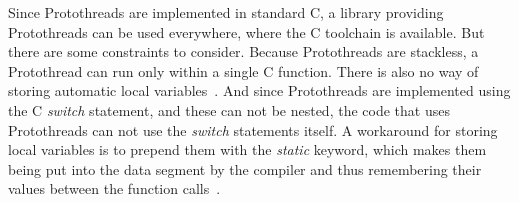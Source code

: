 Since Protothreads are implemented in standard C, a library providing Protothreads can be used everywhere,
where the C toolchain is available.
But there are some constraints to consider.
Because Protothreads are stackless, a Protothread can run only within a single C function. %
There is also no way of storing automatic local variables~\cite{contiki-docs}. %
And since Protothreads are implemented using the C {\it switch} statement, and these can %
not be nested, the code that uses Protothreads can not use the {\it switch} statements itself.
A workaround for storing local variables is to prepend them with the {\it static} keyword,
which makes them being put into the data segment %
by the compiler and thus remembering their values between the function calls~\cite{paper-protothreads}.

